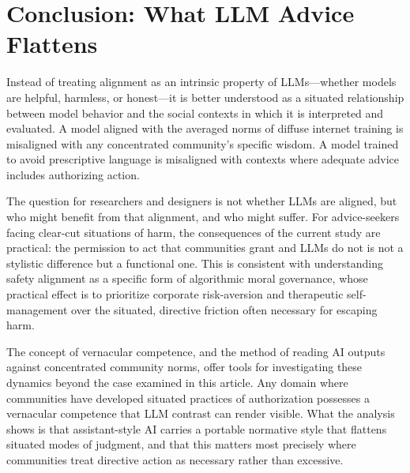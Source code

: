 \section{Conclusion: What LLM Advice Flattens}

Instead of treating alignment as an intrinsic property of LLMs---whether models are helpful, harmless, or honest---it is better understood as a situated relationship between model behavior and the social contexts in which it is interpreted and evaluated. A model aligned with the averaged norms of diffuse internet training is misaligned with any concentrated community's specific wisdom. A model trained to avoid prescriptive language is misaligned with contexts where adequate advice includes authorizing action. 

The question for researchers and designers is not whether LLMs are aligned, but who might benefit from that alignment, and who might suffer. For advice-seekers facing clear-cut situations of harm, the consequences of the current study are practical: the permission to act that communities grant and LLMs do not is not a stylistic difference but a functional one. This is consistent with understanding safety alignment as a specific form of algorithmic moral governance, whose practical effect is to prioritize corporate risk-aversion and therapeutic self-management over the situated, directive friction often necessary for escaping harm.

The concept of vernacular competence, and the method of reading AI outputs against concentrated community norms, offer tools for investigating these dynamics beyond the case examined in this article. Any domain where communities have developed situated practices of authorization possesses a vernacular competence that LLM contrast can render visible. What the analysis shows is that assistant-style AI carries a portable normative style that flattens situated modes of judgment, and that this matters most precisely where communities treat directive action as necessary rather than excessive.
